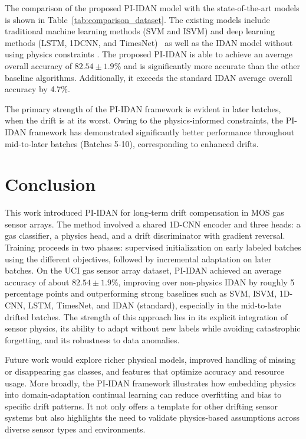 \documentclass{IEEE_lsens}
\begin{document}
The comparison of the proposed PI-IDAN model with the state-of-the-art models is shown in  Table~\ref{tab:comparison_dataset}. The existing models include traditional machine learning methods (SVM and ISVM) and deep learning methods (LSTM, 1DCNN, and TimesNet)~\cite{zhao2019sensor, ige2024state} as well as the IDAN model without using physics constraints \cite{dong2025real}. The proposed PI-IDAN is able to achieve an average overall accuracy of $\mathrm{82.54 \pm 1.9}$\% and is significantly more accurate than the other baseline algorithms. Additionally, it exceeds the standard IDAN average overall accuracy by 4.7\%.

The primary strength of the PI-IDAN framework is evident in later batches, when the drift is at its worst. Owing to the physics-informed constraints, the PI-IDAN framework has demonstrated significantly better performance throughout mid-to-later batches (Batches 5-10), corresponding to enhanced drifts.
\section{Conclusion}
This work introduced PI-IDAN for long-term drift compensation in MOS gas sensor arrays. The method involved a shared 1D-CNN encoder and three heads: a gas classifier, a physics head, and a drift discriminator with gradient reversal. Training proceeds in two phases: supervised initialization on early labeled batches using the different objectives, followed by incremental adaptation on later batches. On the UCI gas sensor array dataset, PI-IDAN achieved an average accuracy of about $\mathrm{82.54 \pm 1.9}$\%, improving over non-physics IDAN by roughly 5 percentage points and outperforming strong baselines such as SVM, ISVM, 1D-CNN, LSTM, TimesNet, and IDAN (standard), especially in the mid-to-late drifted batches. The strength of this approach lies in its explicit integration of sensor physics, its ability to adapt without new labels while avoiding catastrophic forgetting, and its robustness to data anomalies. %

Future work would explore richer physical models, improved handling of missing or disappearing gas classes, and features that optimize accuracy and resource usage. More broadly, the PI‑IDAN framework illustrates how embedding physics into domain‑adaptation continual learning can reduce overfitting and bias to specific drift patterns. It not only offers a template for other drifting sensor systems but also highlights the need to validate physics‑based assumptions across diverse sensor types and environments.
\end{document}

